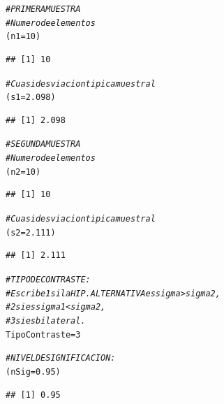 \documentclass[10pt,a4paper]{article}\usepackage[]{graphicx}\usepackage[]{color}
\makeatletter
\newcommand{\hlnum}[1]{\textcolor[rgb]{0.686,0.059,0.569}{#1}}%
\newcommand{\hlcom}[1]{\textcolor[rgb]{0.678,0.584,0.686}{\textit{#1}}}%
\newcommand{\hlstd}[1]{\textcolor[rgb]{0.345,0.345,0.345}{#1}}%
\newcommand{\hlkwb}[1]{\textcolor[rgb]{0.69,0.353,0.396}{#1}}%
\newenvironment{kframe}{%
 \def\at@end@of@kframe{}%
 \ifinner\ifhmode%
  \def\at@end@of@kframe{\end{minipage}}%
  \begin{minipage}{\columnwidth}%
 \fi\fi%
 \def\FrameCommand##1{\hskip\@totalleftmargin \hskip-\fboxsep
 \colorbox{shadecolor}{##1}\hskip-\fboxsep
     \hskip-\linewidth \hskip-\@totalleftmargin \hskip\columnwidth}%
 \MakeFramed {\advance\hsize-\width
   \@totalleftmargin\z@ \linewidth\hsize
   \@setminipage}}%
 {\par\unskip\endMakeFramed%
 \at@end@of@kframe}
\newenvironment{knitrout}{}{} %
\makeatother
\begin{document}
\begin{knitrout}
\color{fgcolor}\begin{kframe}
\begin{alltt}
 \hlcom{# PRIMERA MUESTRA}
 \hlcom{# Numero de elementos}
 \hlstd{(n1} \hlkwb{=} \hlnum{10}\hlstd{)}
\end{alltt}
\begin{verbatim}
## [1] 10
\end{verbatim}
\begin{alltt}
 \hlcom{# Cuasidesviacion tipica muestral}
 \hlstd{(s1} \hlkwb{=} \hlnum{2.098}\hlstd{)}
\end{alltt}
\begin{verbatim}
## [1] 2.098
\end{verbatim}
\begin{alltt}
 \hlcom{# SEGUNDA MUESTRA}
 \hlcom{# Numero de elementos}
 \hlstd{(n2} \hlkwb{=} \hlnum{10}\hlstd{)}
\end{alltt}
\begin{verbatim}
## [1] 10
\end{verbatim}
\begin{alltt}
 \hlcom{# Cuasidesviacion tipica  muestral}
 \hlstd{(s2} \hlkwb{=} \hlnum{2.111}\hlstd{)}
\end{alltt}
\begin{verbatim}
## [1] 2.111
\end{verbatim}
\begin{alltt}
 \hlcom{# TIPO DE CONTRASTE:}
 \hlcom{# Escribe 1 si la HIP. ALTERNATIVA es sigma > sigma2,}
 \hlcom{#         2 si es sigma1 < sigma2,}
 \hlcom{#         3 si es bilateral.}
 \hlstd{TipoContraste} \hlkwb{=} \hlnum{3}

 \hlcom{#NIVEL DE SIGNIFICACION:}
 \hlstd{(nSig} \hlkwb{=} \hlnum{0.95}\hlstd{)}
\end{alltt}
\begin{verbatim}
## [1] 0.95
\end{verbatim}
\end{kframe}
\end{knitrout}
\end{document}
